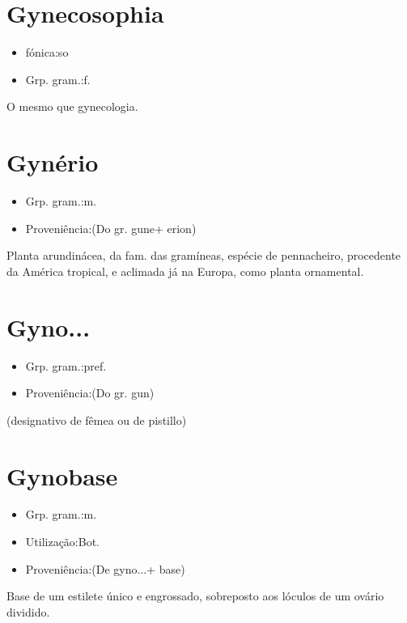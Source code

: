 \section{Gynecosophia}
\begin{itemize}
\item {fónica:so}
\end{itemize}
\begin{itemize}
\item {Grp. gram.:f.}
\end{itemize}
O mesmo que \textunderscore gynecologia\textunderscore .
\section{Gynério}
\begin{itemize}
\item {Grp. gram.:m.}
\end{itemize}
\begin{itemize}
\item {Proveniência:(Do gr. \textunderscore gune\textunderscore  + \textunderscore erion\textunderscore )}
\end{itemize}
Planta arundinácea, da fam. das gramíneas, espécie de pennacheiro, procedente da América tropical, e aclimada já na Europa, como planta ornamental.
\section{Gyno...}
\begin{itemize}
\item {Grp. gram.:pref.}
\end{itemize}
\begin{itemize}
\item {Proveniência:(Do gr. \textunderscore gun\textunderscore )}
\end{itemize}
(designativo de fêmea ou de pistillo)
\section{Gynobase}
\begin{itemize}
\item {Grp. gram.:m.}
\end{itemize}
\begin{itemize}
\item {Utilização:Bot.}
\end{itemize}
\begin{itemize}
\item {Proveniência:(De \textunderscore gyno...\textunderscore  + \textunderscore base\textunderscore )}
\end{itemize}
Base de um estilete único e engrossado, sobreposto aos lóculos de um ovário dividido.
